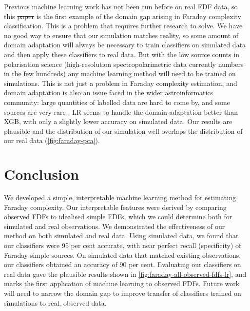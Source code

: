 \documentclass[11pt, a4paper]{book}
\providecommand{\DIFaddtex}[1]{{\protect\color{blue}\uwave{#1}}} %
\providecommand{\DIFdeltex}[1]{{\protect\color{red}\sout{#1}}}                      %
\providecommand{\DIFaddbegin}{} %
\providecommand{\DIFaddend}{} %
\providecommand{\DIFdelbegin}{} %
\providecommand{\DIFdelend}{} %
\providecommand{\DIFadd}[1]{\texorpdfstring{\DIFaddtex{#1}}{#1}} %
\providecommand{\DIFdel}[1]{\texorpdfstring{\DIFdeltex{#1}}{}} %
\newcommand{\DIFscaledelfig}{0.5}
\newlength{\DIFdelgraphicswidth} %
\newlength{\DIFdelgraphicsheight} %
\newcommand{\DIFaddincludegraphics}[2][]{{\color{blue}\fbox{\DIFOincludegraphics[#1]{#2}}}} %
\newcommand{\DIFdelincludegraphics}[2][]{%
\sbox{\DIFdelgraphicsbox}{\DIFOincludegraphics[#1]{#2}}%
\settoboxwidth{\DIFdelgraphicswidth}{\DIFdelgraphicsbox} %
\settoboxtotalheight{\DIFdelgraphicsheight}{\DIFdelgraphicsbox} %
\scalebox{\DIFscaledelfig}{%
\parbox[b]{\DIFdelgraphicswidth}{\usebox{\DIFdelgraphicsbox}\\[-\baselineskip] \rule{\DIFdelgraphicswidth}{0em}}\llap{\resizebox{\DIFdelgraphicswidth}{\DIFdelgraphicsheight}{%
\setlength{\unitlength}{\DIFdelgraphicswidth}%
\begin{picture}(1,1)%
\thicklines\linethickness{2pt} %
{\color[rgb]{1,0,0}\put(0,0){\framebox(1,1){}}}%
{\color[rgb]{1,0,0}\put(0,0){\line( 1,1){1}}}%
{\color[rgb]{1,0,0}\put(0,1){\line(1,-1){1}}}%
\end{picture}%
}\hspace*{3pt}}} %
} %
\DeclareRobustCommand{\DIFaddbegin}{\DIFOaddbegin \let\includegraphics\DIFaddincludegraphics} %
\DeclareRobustCommand{\DIFaddend}{\DIFOaddend \let\includegraphics\DIFOincludegraphics} %
\DeclareRobustCommand{\DIFdelbegin}{\DIFOdelbegin \let\includegraphics\DIFdelincludegraphics} %
\DeclareRobustCommand{\DIFdelend}{\DIFOaddend \let\includegraphics\DIFOincludegraphics} %
\begin{document}
    Previous machine learning work \citep[e.g.][]{brown_classifying_2018} has not been run before on real FDF data, so this \DIFdelbegin \DIFdel{paper }\DIFdelend \DIFaddbegin \DIFadd{chapter }\DIFaddend is the first example of the domain gap arising in Faraday complexity classification. This is a problem that requires further research to solve. We have no good way to ensure that our simulation matches reality, so some amount of domain adaptation will always be necessary to train classifiers on simulated data and then apply these classifiers to real data. But with the low source counts in polarisation science (high-resolution spectropolarimetric data currently numbers in the few hundreds) any machine learning method will need to be trained on simulations. This is not just a problem in Faraday complexity estimation, and domain adaptation is also an issue faced in the wider astroinformatics community: large quantities of labelled data are hard to come by, and some sources are very rare \citep[e.g. gravitational wave detections or fast radio bursts;][]{zevin17gravityspy, gebhard19convolutional,agarwal_fetch_2020}. LR seems to handle the domain adaptation better than XGB, with only a slightly lower accuracy on simulated data. Our results are plausible and the distribution of our simulation well overlaps the distribution of our real data (\autoref{fig:faraday-pca}).

\section{Conclusion}
\label{sec:faraday-conclusion}

  We developed a simple, interpretable machine learning method for estimating Faraday complexity. Our interpretable features were derived by comparing observed FDFs to idealised simple FDFs, which we could determine both for simulated and real observations. We demonstrated the effectiveness of our method on both simulated and real data. Using simulated data, we found that our classifiers were 95 per cent accurate, with near perfect recall (specificity) of Faraday simple sources. On simulated data that matched existing observations, our classifiers obtained an accuracy of 90 per cent. Evaluating our classifiers on real data gave the plausible results shown in \autoref{fig:faraday-all-observed-fdfs-lr}, and marks the first application of machine learning to observed FDFs. Future work will need to narrow the domain gap to improve transfer of classifiers trained on simulations to real, observed data.
\end{document}
